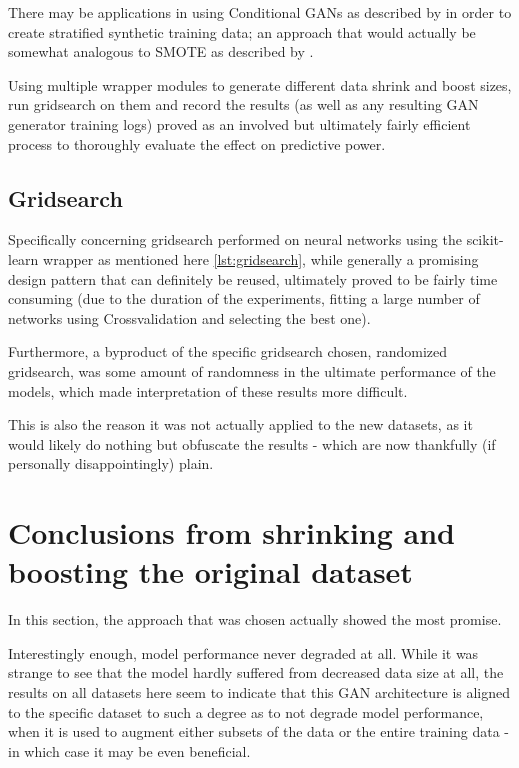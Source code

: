 There may be applications in using Conditional \acp{GAN} as described by \cite{conditional_gans} in order to create stratified synthetic training data; an approach that would actually be somewhat analogous to \ac{SMOTE} as described by \cite{smote}.

Using multiple wrapper modules to generate different data shrink and boost sizes, run gridsearch on them and record the results (as well as any resulting \ac{GAN} generator training logs) proved as an involved but ultimately fairly efficient process to thoroughly evaluate the effect on predictive power.

\pagebreak

\subsection{Gridsearch}

Specifically concerning gridsearch performed on neural networks using the scikit-learn wrapper as mentioned here \ref{lst:gridsearch}, while generally a promising design pattern that can definitely be reused, ultimately proved to be fairly time consuming (due to the duration of the experiments, fitting a large number of networks using Crossvalidation and selecting the best one). 

Furthermore, a byproduct of the specific gridsearch chosen, randomized gridsearch, was some amount of randomness in the ultimate performance of the models, which made interpretation of these results more difficult. 

This is also the reason it was not actually applied to the new datasets, as it would likely do nothing but obfuscate the results - which are now thankfully (if personally disappointingly) plain.

\pagebreak

\section{Conclusions from shrinking and boosting the original dataset}

In this section, the approach that was chosen actually showed the most promise. 

Interestingly enough, model performance never degraded at all. While it was strange to see that the model hardly suffered from decreased data size at all, the results on all datasets here seem to indicate that this \ac{GAN} architecture is aligned to the specific dataset to such a degree as to not degrade model performance, when it is used to augment either subsets of the data or the entire training data - in which case it may be even beneficial.

